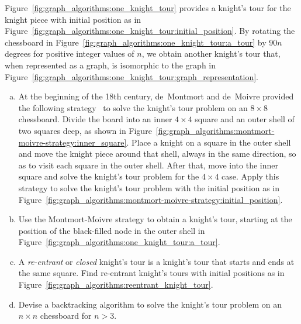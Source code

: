 \begin{problem}
\item Figure~\ref{fig:graph_algorithms:one_knight_tour} provides a
  knight's tour for the knight piece with initial position as in
  Figure~\ref{fig:graph_algorithms:one_knight_tour:initial_position}. By
  rotating the chessboard in
  Figure~\ref{fig:graph_algorithms:one_knight_tour:a_tour} by
  $90n$ degrees for positive integer values of $n$, we obtain another
  knight's tour that, when represented as a graph, is isomorphic to
  the graph in
  Figure~\ref{fig:graph_algorithms:one_knight_tour:graph_representation}.
  \begin{enumerate}[(a)]
  \item At the beginning of the 18th century,
    de~Montmort and
    de~Moivre provided the following
    strategy~\cite[p.176]{BallCoxeter1987} to solve the knight's tour
    problem on an $8 \times 8$ chessboard. Divide the board into an
    inner $4 \times 4$ square and an outer shell of two squares deep,
    as shown in
    Figure~\ref{fig:graph_algorithms:montmort-moivre-strategy:inner_square}.
    Place a knight on a square in the outer shell and move the knight
    piece around that shell, always in the same direction, so as to
    visit each square in the outer shell. After that, move into the
    inner square and solve the knight's tour problem for the
    $4 \times 4$ case. Apply this strategy to solve the knight's tour
    problem with the initial position as in
    Figure~\ref{fig:graph_algorithms:montmort-moivre-strategy:initial_position}.

  \item Use the Montmort-Moivre
    strategy to obtain a knight's tour, starting at the position of
    the black-filled node in the outer shell in
    Figure~\ref{fig:graph_algorithms:one_knight_tour:a_tour}.

  \item A \emph{re-entrant} or \emph{closed} knight's tour is a
    knight's tour that starts and ends at the same square. Find
    re-entrant knight's tours with initial positions as in
    Figure~\ref{fig:graph_algorithms:reentrant_knight_tour}.

  \item Devise a backtracking algorithm to solve the knight's tour
    problem on an $n \times n$ chessboard for $n > 3$.
  \end{enumerate}


\end{problem}

